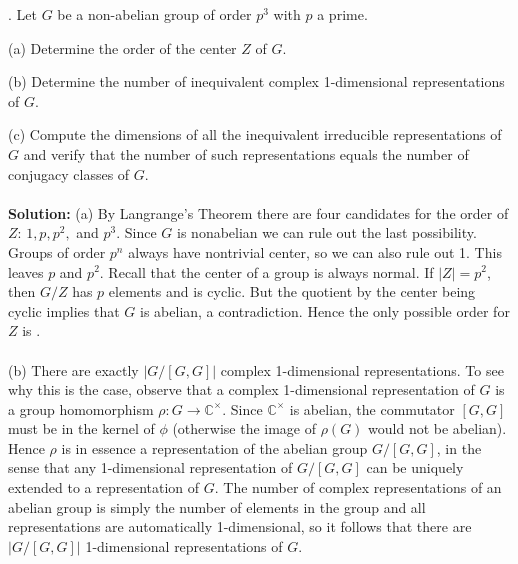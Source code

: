 \documentclass[11pt]{article}
\newcommand{\C}{\mathbb{C}}
\begin{document}
. Let $G$ be a non-abelian group of order $p^3$ with $p$ a prime.

(a) Determine the order of the center $Z$ of $G$.

(b) Determine the number of inequivalent complex 1-dimensional representations of $G$. 

(c) Compute the dimensions of all the inequivalent irreducible representations of $G$ and verify that the number of such representations equals the number of conjugacy classes of $G$. \\\\
\textbf{Solution:} (a) By Langrange's Theorem there are four candidates for the order of $Z$: $1,p,p^2,$ and $p^3$. Since $G$ is nonabelian we can rule out the last possibility. Groups of order $p^n$ always have nontrivial center, so we can also rule out 1. This leaves $p$ and $p^2$. Recall that the center of a group is always normal. If $|Z| = p^2$, then $G/Z$ has $p$ elements and is cyclic. But the quotient by the center being cyclic implies that $G$ is abelian, a contradiction. Hence the only possible order for $Z$ is .\\\\
(b)
There are exactly $|G/[G,G]|$ complex 1-dimensional representations. To see why this is the case, observe that a complex 1-dimensional representation of $G$ is a group homomorphism $\rho:G\to \C^\times$. Since $\C^\times$ is abelian, the commutator $[G,G]$ must be in the kernel of $\phi$ (otherwise the image of $\rho(G)$ would not be abelian). Hence $\rho$ is in essence a representation of the abelian group $G/[G,G]$, in the sense that any 1-dimensional representation of $G/[G,G]$ can be uniquely extended to a representation of $G$. The number of complex representations of an abelian group is simply the number of elements in the group and all representations are automatically 1-dimensional, so it follows that there are $|G/[G,G]|$ 1-dimensional representations of $G$.
\end{document}
